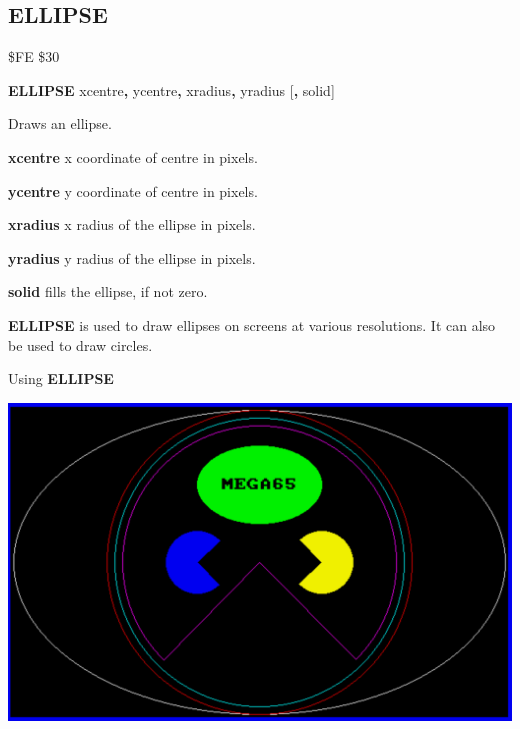 \subsection{ELLIPSE}
\begin{description}[leftmargin=2cm,style=nextline]
\item [Token:] \$FE \$30
\item [Format:] {\bf ELLIPSE} xcentre{\bf,} ycentre{\bf,} xradius{\bf,} yradius
		[{\bf,} solid]
\item [Usage:] Draws an ellipse.

               {\bf xcentre} x coordinate of centre in pixels.

               {\bf ycentre} y coordinate of centre in pixels.

               {\bf xradius} x radius of the ellipse in pixels.

               {\bf yradius} y radius of the ellipse in pixels.

               {\bf solid} fills the ellipse, if not zero.

\item [Remarks:] {\bf ELLIPSE} is used to draw ellipses on
               screens at various resolutions.
               It can also be used to draw circles.

\item [Example:] Using {\bf ELLIPSE}


\item \begin{center}\includegraphics[width=0.7\linewidth]{images/ellipse.png}\end{center}


\end{description}
